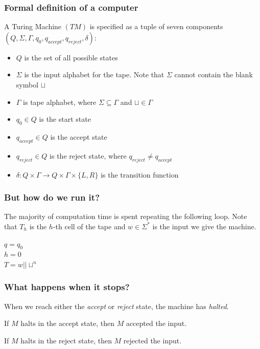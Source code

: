 \documentclass[aspectratio=169]{beamer}
\begin{document}
\begin{frame}
\frametitle{Formal definition of a computer}
A Turing Machine $(TM)$ is specified as a tuple of seven components $(Q, \Sigma, \Gamma, q_0, q_{accept}, q_{reject}, \delta)$:

\begin{itemize}
    \item<1-> $Q$ is the set of all possible states
    \item<2-> $\Sigma$ is the input alphabet for the tape. Note that $\Sigma$ cannot contain the blank symbol $\sqcup$
    \item<3-> $\Gamma$ is tape alphabet, where $\Sigma \subseteq \Gamma$ and $\sqcup \in \Gamma$
    \item<4-> $q_0 \in Q$ is the start state
    \item<5-> $q_{accept} \in Q$ is the accept state
    \item<6-> $q_{reject} \in Q$ is the reject state, where $q_{reject} \neq q_{accept}$
    \item<7-> $\delta: Q \times \Gamma \to Q \times \Gamma \times \{L, R\}$ is the transition function
\end{itemize}
\end{frame}

\begin{frame}
\frametitle{But how do we run it?}
The majority of computation time is spent repeating the following loop. Note that $T_h$ is the $h$-th cell of the tape and $w \in \Sigma^*$ is the input we give the machine.
\begin{algorithm}[H]
$q = q_0$\\
$h = 0$\\
$T = w||\sqcup^n$ 
\end{algorithm}
\end{frame}

\begin{frame}
\frametitle{What happens when it stops?}
When we reach either the {\em accept} or {\em reject} state, the machine has {\em halted}.

If $M$ halts in the accept state, then $M$ accepted the input.

If $M$ halts in the reject state, then $M$ rejected the input.
\end{frame}
\end{document}
